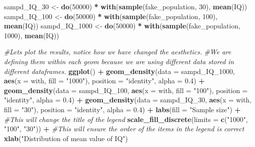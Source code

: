 \documentclass[
]{book}
\newenvironment{Shaded}{\begin{snugshade}}{\end{snugshade}}
\newcommand{\AttributeTok}[1]{\textcolor[rgb]{0.13,0.29,0.53}{#1}}
\newcommand{\CommentTok}[1]{\textcolor[rgb]{0.56,0.35,0.01}{\textit{#1}}}
\newcommand{\DecValTok}[1]{\textcolor[rgb]{0.00,0.00,0.81}{#1}}
\newcommand{\FloatTok}[1]{\textcolor[rgb]{0.00,0.00,0.81}{#1}}
\newcommand{\FunctionTok}[1]{\textcolor[rgb]{0.13,0.29,0.53}{\textbf{#1}}}
\newcommand{\NormalTok}[1]{#1}
\newcommand{\OtherTok}[1]{\textcolor[rgb]{0.56,0.35,0.01}{#1}}
\newcommand{\SpecialCharTok}[1]{\textcolor[rgb]{0.81,0.36,0.00}{\textbf{#1}}}
\newcommand{\StringTok}[1]{\textcolor[rgb]{0.31,0.60,0.02}{#1}}
\begin{document}
\begin{Shaded}
\begin{Highlighting}[]
\NormalTok{sampd\_IQ\_30 }\OtherTok{\textless{}{-}} \FunctionTok{do}\NormalTok{(}\DecValTok{50000}\NormalTok{) }\SpecialCharTok{*} \FunctionTok{with}\NormalTok{(}\FunctionTok{sample}\NormalTok{(fake\_population, }\DecValTok{30}\NormalTok{), }\FunctionTok{mean}\NormalTok{(IQ))}
\NormalTok{sampd\_IQ\_100 }\OtherTok{\textless{}{-}} \FunctionTok{do}\NormalTok{(}\DecValTok{50000}\NormalTok{) }\SpecialCharTok{*} \FunctionTok{with}\NormalTok{(}\FunctionTok{sample}\NormalTok{(fake\_population, }\DecValTok{100}\NormalTok{), }\FunctionTok{mean}\NormalTok{(IQ))}
\NormalTok{sampd\_IQ\_1000 }\OtherTok{\textless{}{-}} \FunctionTok{do}\NormalTok{(}\DecValTok{50000}\NormalTok{) }\SpecialCharTok{*} \FunctionTok{with}\NormalTok{(}\FunctionTok{sample}\NormalTok{(fake\_population, }\DecValTok{1000}\NormalTok{), }\FunctionTok{mean}\NormalTok{(IQ))  }

\CommentTok{\#Let\textquotesingle{}s plot the results, notice how we have changed the aesthetics. }
\CommentTok{\#We are defining them within each geom because we are using different data stored in different dataframes.}
\FunctionTok{ggplot}\NormalTok{() }\SpecialCharTok{+} 
  \FunctionTok{geom\_density}\NormalTok{(}\AttributeTok{data =}\NormalTok{ sampd\_IQ\_1000, }\FunctionTok{aes}\NormalTok{(}\AttributeTok{x =}\NormalTok{ with, }\AttributeTok{fill =} \StringTok{"1000"}\NormalTok{), }\AttributeTok{position =} \StringTok{"identity"}\NormalTok{, }\AttributeTok{alpha =} \FloatTok{0.4}\NormalTok{) }\SpecialCharTok{+}
   \FunctionTok{geom\_density}\NormalTok{(}\AttributeTok{data =}\NormalTok{ sampd\_IQ\_100, }\FunctionTok{aes}\NormalTok{(}\AttributeTok{x =}\NormalTok{ with, }\AttributeTok{fill =} \StringTok{"100"}\NormalTok{), }\AttributeTok{position =} \StringTok{"identity"}\NormalTok{, }\AttributeTok{alpha =} \FloatTok{0.4}\NormalTok{) }\SpecialCharTok{+}
   \FunctionTok{geom\_density}\NormalTok{(}\AttributeTok{data =}\NormalTok{ sampd\_IQ\_30, }\FunctionTok{aes}\NormalTok{(}\AttributeTok{x =}\NormalTok{ with, }\AttributeTok{fill =} \StringTok{"30"}\NormalTok{), }\AttributeTok{position =} \StringTok{"identity"}\NormalTok{, }\AttributeTok{alpha =} \FloatTok{0.4}\NormalTok{) }\SpecialCharTok{+}
  \FunctionTok{labs}\NormalTok{(}\AttributeTok{fill =} \StringTok{"Sample size"}\NormalTok{) }\SpecialCharTok{+} \CommentTok{\#This will change the title of the legend}
  \FunctionTok{scale\_fill\_discrete}\NormalTok{(}\AttributeTok{limits =} \FunctionTok{c}\NormalTok{(}\StringTok{"1000"}\NormalTok{, }\StringTok{"100"}\NormalTok{, }\StringTok{"30"}\NormalTok{)) }\SpecialCharTok{+} \CommentTok{\#This will ensure the order of the items in the legend is correct}
  \FunctionTok{xlab}\NormalTok{(}\StringTok{"Distribution of mean value of IQ"}\NormalTok{)}
\end{Highlighting}
\end{Shaded}
\end{document}
